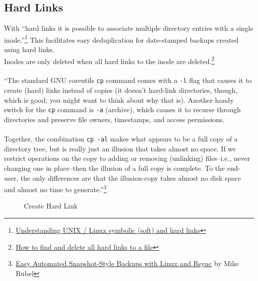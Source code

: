 \documentclass[12pt,letterpaper,dvips]{article}
\newcommand{\cmd}[1]{\texttt{#1}}
\begin{document}
\subsection{Hard Links}
With ``hard links it is possible to associate multiple directory entries with a single
inode.''\footnote{\href{http://www.cyberciti.biz/tips/understanding-unixlinux-symbolic-soft-and-hard-links.html}{Understanding UNIX / Linux symbolic (soft) and hard links}}
This facilitates easy deduplication for date-stamped backups created using hard links.\\
Inodes are only deleted when all hard links to the inode are deleted.\footnote{\href{http://linuxcommando.blogspot.com/2008/09/how-to-find-and-delete-all-hard-links.html}{How to find and delete all hard links to a file}} 
\\
\\
\noindent ``The standard GNU coreutils \cmd{cp} command comes with a \cmd{-l} flag that causes it to
create (hard) links instead of copies (it doesn't hard-link directories, though, which is good; you
might want to think about why that is).  Another handy switch for the \cmd{cp} command is \cmd{-a}
(archive), which causes it to recurse through directories and preserve file owners, timestamps, and
access permissions.\\
\\
\noindent Together, the combination \cmd{cp -al} makes what appears to be a full copy of a directory
tree, but is really just an illusion that takes almost no space.  If we restrict operations on the
copy to adding or removing (unlinking) files--i.e., never changing one in place--then the illusion of
a full copy is complete.  To the end-user, the only differences are that the illusion-copy takes
almost no disk space and almost no time to generate.''\footnote{\href{http://www.mikerubel.org/computers/rsync_snapshots/}{Easy Automated Snapshot-Style Backups with Linux and Rsync} by Mike Rubel}

\begin{figure}
\begin{center}
\framebox{
\begin{minipage}[t]{0.10\textwidth}
\begin{center}
\cmd{cp -al}
\end{center}
\end{minipage}
}
\caption{Create Hard Link}
\label{fig:create_hard_link}
\end{center}
\end{figure}
\end{document}
